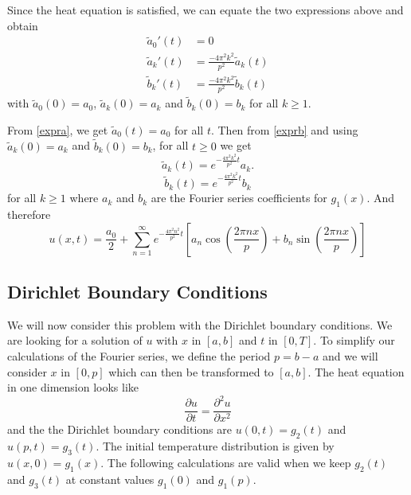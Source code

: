\documentclass[00main.tex]{subfiles}
\begin{document}
Since the heat equation is satisfied, we can equate the two expressions above and obtain \begin{align}
\tilde{a}_0' (t) & = 0 \label{expra} \\
\tilde{a}_k' (t) &= \frac{-4\pi^2k^2}{p^2} \tilde{a}_k (t) \label{exprb} \\
\tilde{b}_k' (t) &= \frac{-4\pi^2k^2}{p^2} \tilde{b}_k (t) \label{exprc}
\end{align} with $\tilde{a}_0 (0) = a_0$, $\tilde{a}_k (0) = a_k$ and $\tilde{b}_k (0) = b_k$ for all $k \geq 1$.

From \eqref{expra}, we get $\tilde{a}_0 (t) = a_0$ for all $t$. Then from \eqref{exprb} and using $\tilde{a}_k (0) = a_k$ and $\tilde{b}_k (0) = b_k$, for all $ t\geq 0$ we get \[ \tilde{a}_k (t) = e^{-\frac{4\pi^2k^2}{p^2}t}a_k. \] %
\[ \tilde{b}_k (t) = e^{-\frac{4\pi^2 k^2}{p^2}t}b_k  \] for all $ k \geq 1$ where $a_k$ and $b_k$ are the Fourier series coefficients for $g_1(x)$. And therefore \begin{equation}
u(x,t) =  \frac{a_0}{2} + \sum_{n=1}^\infty e^{-\frac{4\pi^2 n^2}{p^2}t} \left[ a_n \cos \left( \frac{2\pi nx}{p} \right) + b_n \sin \left( \frac{2\pi nx}{p} \right) \right]
\end{equation}


\subsection{Dirichlet Boundary Conditions}


We will now consider this problem with the Dirichlet boundary conditions. We are looking for a solution of $u$ with $x$ in $[a,b]$ and $t$ in $[0,T]$. To simplify our calculations of the Fourier series, we define the period $p=b-a$ and we will consider $x$ in $[0,p]$ which can then be transformed to $[a,b]$. The heat equation in one dimension looks like \begin{equation}
\frac{\partial u}{\partial t} = \frac{\partial^2 u}{\partial x^2} \label{heat4b}
\end{equation} and the the Dirichlet boundary conditions are $u(0,t) = g_2(t)$ and $u(p,t) = g_3(t)$. The initial temperature distribution is given by $u(x,0) = g_1(x)$. The following calculations are valid when we  keep $g_2(t)$ and $g_3(t)$ at constant values $g_1(0)$ and $g_1(p)$. 


\end{document}

